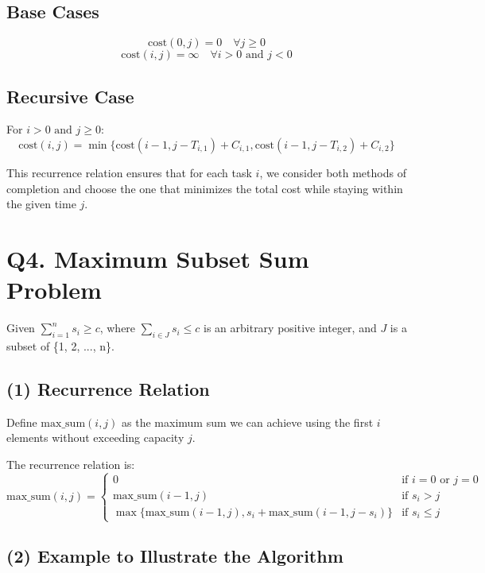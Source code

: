 \documentclass{article}
\begin{document}
\subsection*{Base Cases}
\[
    \text{cost}(0, j) = 0 \quad \forall j \geq 0
\]
\[
    \text{cost}(i, j) = \infty \quad \forall i > 0 \text{ and } j < 0
\]

\subsection*{Recursive Case}
For \( i > 0 \text{ and } j \geq 0 \):
\[
    \text{cost}(i, j) = \min\{\text{cost}(i-1, j - T_{i,1}) + C_{i,1}, \text{cost}(i-1, j - T_{i,2}) + C_{i,2}\}
\]

This recurrence relation ensures that for each task \( i \), we consider both methods of completion and choose the one that minimizes the total cost while staying within the given time \( j \).

\section{Q4. Maximum Subset Sum Problem}

Given \( \sum_{i=1}^n s_i \geq c \), where \( \sum_{i \in J} s_i \leq c \) is an arbitrary positive integer, and \( J \) is a subset of \{1, 2, ..., n\}.

\subsection*{(1) Recurrence Relation}

Define \( \text{max\_sum}(i, j) \) as the maximum sum we can achieve using the first \( i \) elements without exceeding capacity \( j \).

The recurrence relation is:
\[
    \text{max\_sum}(i, j) =
    \begin{cases}
        0                                                                    & \text{if } i = 0 \text{ or } j = 0 \\
        \text{max\_sum}(i-1, j)                                              & \text{if } s_i > j                 \\
        \max\{\text{max\_sum}(i-1, j), s_i + \text{max\_sum}(i-1, j - s_i)\} & \text{if } s_i \leq j
    \end{cases}
\]

\subsection*{(2) Example to Illustrate the Algorithm}
\end{document}
